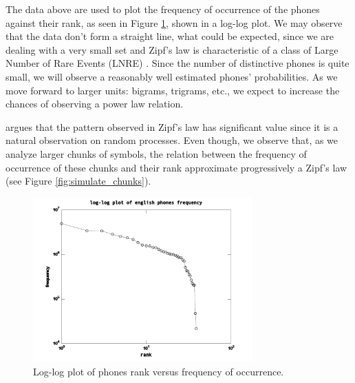 The data above are used to plot the frequency of occurrence of the phones against 
their rank, as seen in Figure \ref{fig:phonesfrequency_en}, shown in a log-log plot. 
We may observe that the data don't form a straight line, 
what could be expected, since we are dealing with a very small set and Zipf's law is
characteristic of a class of Large Number of Rare Events (LNRE) \citep{baayen2001}. 
Since the number of distinctive phones is quite small, we will observe a reasonably
well estimated phones' probabilities. As we move forward to larger units: bigrams, trigrams,
etc., we expect to increase the chances of observing a power law relation.

\cite{li1992} argues that the pattern observed in Zipf's law has significant value
since it is a natural observation on random processes.
Even though, we observe that, as we analyze larger chunks of 
symbols, the relation between the frequency of occurrence of these chunks and their rank 
approximate progressively a Zipf's law (see Figure \ref{fig:simulate_chunks}).

\begin{figure}[h!]
\centering
\includegraphics[width=0.75\textwidth]{images/phonesfrequency_en.pdf}
\caption{Log-log plot of phones rank versus frequency of occurrence.}
\label{fig:phonesfrequency_en}
\end{figure} 


